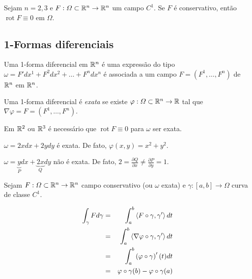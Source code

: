 \documentclass{book}
\newcommand{\rot}{\operatorname{rot}}	%
\begin{document}
\begin{teo}
Sejam $n=2,3$ e $F:\varOmega \subset \mathbb{R}^n \to \mathbb{R}^n$ um campo $C^1$. Se $F$ \'e conservativo, ent\~ao $\rot F \equiv 0$ em $\varOmega$.
\end{teo}

\subsection*{1-Formas diferenciais}

\begin{defn}
  \begin{sloppypar}
    Uma 1-forma diferencial em $\mathbb{R}^n$ \'e uma express\~ao do tipo ${\omega  = F'dx^1  + F^2 dx^2  +  \ldots  + F^n dx^n}$ \'e associada a um campo $F = \left( F^1, \ldots, F^n \right)$ de $\mathbb{R}^n$ em $\mathbb{R}^n$.
  \end{sloppypar}
\end{defn}

\begin{defn}
Uma 1-forma diferencial \'e \textit{exata} se existe $\varphi: \varOmega \subset \mathbb{R}^n \to \mathbb{R}$ tal que $\nabla \varphi = F = \left( F^1, \ldots, F^n \right)$.
\end{defn}

Em $\mathbb{R}^2$ ou $\mathbb{R}^3$ \'e necess\'ario que $\rot F \equiv 0$ para $\omega$ ser exata.

\begin{ex}
$\omega = 2xdx + 2ydy$ \'e exata. De fato, $\varphi(x,y) = x^2 + y^2$.
\end{ex}

\begin{ex}
$\omega  = \underbrace y_Pdx + \underbrace {2x}_Qdy$ n\~ao \'e exata. De fato, $2 = \frac{{\partial Q}}{{\partial x}} \ne \frac{{\partial P}}{{\partial y}} = 1$.
\end{ex}

Sejam $F:\varOmega \subset \mathbb{R}^n \to \mathbb{R}^n$ campo conservativo (ou $\omega$ exata) e $\gamma:[a,b] \to \varOmega$ curva de classe $C^1$.

\begin{eqnarray*}
  \int_\gamma {Fd\gamma }  &=& \int_a^b {\left\langle {F \circ \gamma ,\gamma '} \right\rangle dt}  \hfill \\
   &=& \int_a^b {\left\langle {\nabla \varphi  \circ \gamma ,\gamma '} \right\rangle dt}  \hfill \\
   &=& \int_a^b {\left( {\varphi  \circ \gamma } \right)'(t)dt}  \hfill \\
   &=& \varphi  \circ \gamma (b) - \varphi  \circ \gamma (a) \hfill \\ 
\end{eqnarray*}
\end{document}
